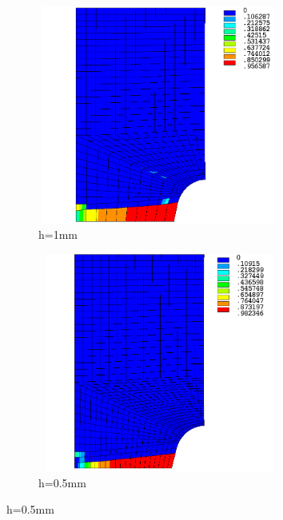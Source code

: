 \documentclass[12pt]{report}
\begin{document}
\\
\begin{figure}[htbp!]
 \centering
     \captionsetup[subfigure]{justification=centering}
     \begin{subfigure}{0.4\textwidth}
      \centering
         \includegraphics[width=8cm,height=7.2cm,keepaspectratio]{25.d2-1.png}
         \caption{h=1mm}
         \label{fig:d2-1}
     \end{subfigure}
     \hspace{1.8cm}
     \begin{subfigure}{0.4\textwidth}
      \centering
         \includegraphics[width=8cm,height=7.2cm,keepaspectratio]{25.d2-0.5.png}
         \caption{h=0.5mm}
         \label{fig:d2-0.5}
     \end{subfigure}
\end{figure}
\end{document}
